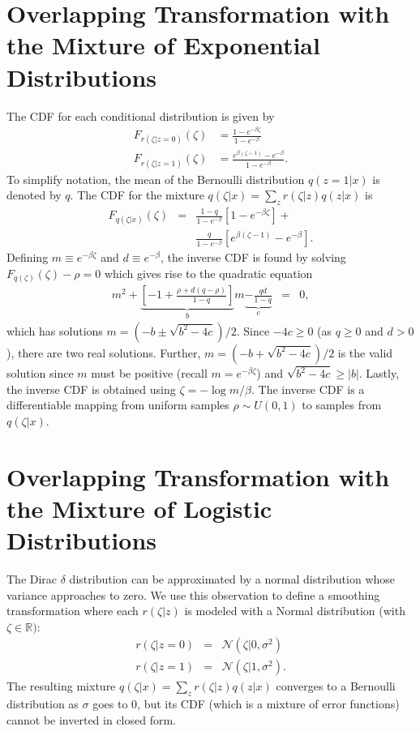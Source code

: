 \documentclass{article}
\begin{document}
\section{Overlapping Transformation with the Mixture of Exponential Distributions} \label{app:overlap}

The CDF for each conditional distribution is given by
\begin{align*}
F_{r(\zeta |z =0)}(\zeta) &=  \frac{1 - e^{-\beta \zeta}}{1 - e^{-\beta}} \\
F_{r(\zeta |z =1)}(\zeta) &=  \frac{e^{\beta (\zeta - 1)} - e^{-\beta}}{1 - e^{-\beta}}.
\end{align*}
To simplify notation, the mean of the Bernoulli distribution $q(z=1|x)$ is denoted by $q$. The CDF for the 
mixture $q(\zeta|x) = \sum_z r(\zeta|z) q(z|x)$ is
\begin{eqnarray*}
F_{q(\zeta|x)}(\zeta) &=& \frac{1 - q }{1 - e^{-\beta}} \left[1 - e^{-\beta \zeta}\right] +  \\
&&\frac{q}{1 - e^{-\beta}} \left[ e^{\beta (\zeta - 1)} - e^{-\beta} \right].
\end{eqnarray*}
Defining $m \equiv e^{-\beta \zeta }$ and $d \equiv e^{- \beta}$, the inverse CDF
is found by solving $F_{q(\zeta)}(\zeta) -\rho = 0$ which gives rise to the quadratic equation
\begin{eqnarray*}
m^2 + \underbrace{ \left[-1 + \frac{\rho + d(q - \rho)}{1 - q} \right]}_{b} m \underbrace{- \frac{qd}{1-q}}_c  &=& 0,
\end{eqnarray*}
which has solutions $m = (-b \pm \sqrt{b^2 - 4c})/2$. Since $-4c\geq 0$ 
(as $q \geq 0$ and $d > 0$), there are two real solutions. Further, $m = (-b + \sqrt{b^2 - 4c})/2$ is the valid solution since 
$m$ must be positive (recall $m=e^{-\beta\zeta}$) and $\sqrt{b^2 - 4c} \geq |b|$.
Lastly, the inverse CDF is obtained using $\zeta = -\log{m}/\beta$. The inverse CDF is a differentiable mapping from uniform samples 
$\rho \sim U(0,1)$ to samples from $q(\zeta |x)$.


\section{Overlapping Transformation with the Mixture of Logistic Distributions} \label{app:otherOverlap}

The Dirac $\delta$ distribution can be approximated by a normal distribution whose variance approaches to zero. We 
use this observation to define a smoothing transformation where each $r(\zeta | z)$ is modeled with a Normal distribution 
(with $\zeta\in\mathbb{R})$:
\begin{eqnarray*}
r(\zeta | z = 0) &=& \mathcal{N}(\zeta | 0, \sigma^2)\\
r(\zeta | z = 1) &=& \mathcal{N}(\zeta | 1, \sigma^2).
\end{eqnarray*}
The resulting mixture $q(\zeta|x) = \sum_z r(\zeta|z) q(z|x)$ converges to a Bernoulli distribution as $\sigma$ goes to 0, but 
its CDF (which is a mixture of error functions) cannot be inverted in closed form.
\end{document}
